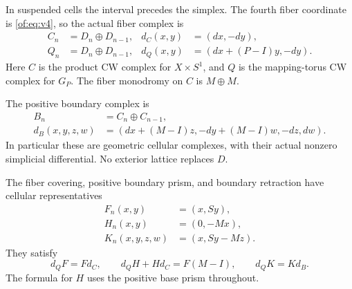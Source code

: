 In suspended cells the interval precedes the simplex.
The fourth fiber coordinate is \eqref{of:eq:v4}, so the actual fiber complex is
\begin{equation}\label{of:eq:CQ}
 \begin{aligned}
 C_n&=D_n\oplus D_{n-1},&d_C(x,y)&=(dx,-dy),\\
 Q_n&=D_n\oplus D_{n-1},&d_Q(x,y)&=(dx+(P-I)y,-dy).
 \end{aligned}
\end{equation}
Here $C$ is the product CW complex for $X\times S^1$, and $Q$ is the
mapping-torus CW complex for $G_P$.
The fiber monodromy on $C$ is $M\oplus M$.

The positive boundary complex is
\begin{equation}\label{of:eq:B}
 \begin{split}
 B_n&=C_n\oplus C_{n-1},\\
 d_B(x,y,z,w)&=(dx+(M-I)z,-dy+(M-I)w,-dz,dw).
 \end{split}
\end{equation}
In particular these are geometric cellular complexes, with their actual
nonzero simplicial differential. No exterior lattice replaces $D$.

\begin{theorem}\label{of:thm:chains}
The fiber covering, positive boundary prism, and boundary retraction have
cellular representatives
\begin{equation}\label{of:eq:FHK}
 \begin{aligned}
 F_n(x,y)&=(x,Sy),\\
 H_n(x,y)&=(0,-Mx),\\
 K_n(x,y,z,w)&=(x,Sy-Mz).
 \end{aligned}
\end{equation}
They satisfy
\begin{equation}\label{of:eq:identities}
 d_QF=Fd_C,\qquad d_QH+Hd_C=F(M-I),\qquad d_QK=Kd_B.
\end{equation}
The formula for $H$ uses the positive base prism throughout.
\end{theorem}

